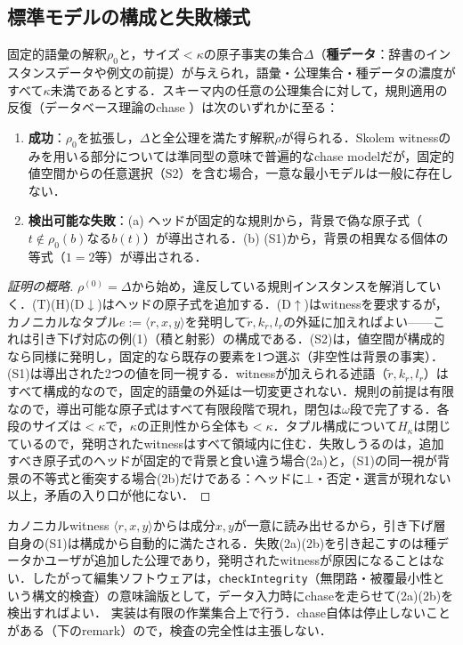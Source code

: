 \documentclass[../../main-detail.tex]{subfiles}
\begin{document}
\subsection{標準モデルの構成と失敗様式}
\begin{theorem}[標準モデル]\label{thm:canonical-model}
    固定的語彙の解釈$\rho_0$と，サイズ$<\kappa$の原子事実の集合$\Delta$（\textbf{種データ}：辞書のインスタンスデータや例文の前提）が与えられ，語彙・公理集合・種データの濃度がすべて$\kappa$未満であるとする．スキーマ内の任意の公理集合に対して，規則適用の反復（データベース理論のchase \cite{data-exchange}）は次のいずれかに至る：
    \begin{enumerate}
        \item \textbf{成功}：$\rho_0$を拡張し，$\Delta$と全公理を満たす解釈$\rho$が得られる．Skolem witnessのみを用いる部分については準同型の意味で普遍的なchase modelだが，固定的値空間からの任意選択（S2）を含む場合，一意な最小モデルは一般に存在しない．
        \item \textbf{検出可能な失敗}：(a) ヘッドが固定的な規則から，背景で偽な原子式（$t \notin \rho_0(b)$なる$b(t)$）が導出される．(b) (S1)から，背景の相異なる個体の等式（$1 = 2$等）が導出される．
    \end{enumerate}
\end{theorem}
\begin{proof}[証明の概略]
    $\rho^{(0)} = \Delta$から始め，違反している規則インスタンスを解消していく．(T)(H)(D$\downarrow$)はヘッドの原子式を追加する．(D$\uparrow$)はwitnessを要求するが，カノニカルなタプル$e := \langle r, x, y \rangle$を発明して$\tilde r, k_r, l_r$の外延に加えればよい——これは引き下げ対応の例(1)（積と射影）の構成である．(S2)は，値空間が構成的なら同様に発明し，固定的なら既存の要素を1つ選ぶ（非空性は背景の事実）．(S1)は導出された2つの値を同一視する．witnessが加えられる述語（$\tilde r, k_r, l_r$）はすべて構成的なので，固定的語彙の外延は一切変更されない．規則の前提は有限なので，導出可能な原子式はすべて有限段階で現れ，閉包は$\omega$段で完了する．各段のサイズは$<\kappa$で，$\kappa$の正則性から全体も$<\kappa$．タプル構成について$H_\kappa$は閉じているので，発明されたwitnessはすべて領域内に住む．失敗しうるのは，追加すべき原子式のヘッドが固定的で背景と食い違う場合(2a)と，(S1)の同一視が背景の不等式と衝突する場合(2b)だけである：ヘッドに$\bot$・否定・選言が現れない以上，矛盾の入り口が他にない．
\end{proof}
\begin{remark}[失敗の源は常にユーザの主張である]
    カノニカルwitness $\langle r, x, y\rangle$からは成分$x, y$が一意に読み出せるから，引き下げ層自身の(S1)は構成から自動的に満たされる．失敗(2a)(2b)を引き起こすのは種データかユーザが追加した公理であり，発明されたwitnessが原因になることはない．したがって編集ソフトウェアは，\texttt{checkIntegrity}（無閉路・被覆最小性という構文的検査）の意味論版として，データ入力時にchaseを走らせて(2a)(2b)を検出すればよい．
    実装は有限の作業集合上で行う．chase自体は停止しないことがある（下のremark）ので，検査の完全性は主張しない．
\end{remark}
\end{document}
